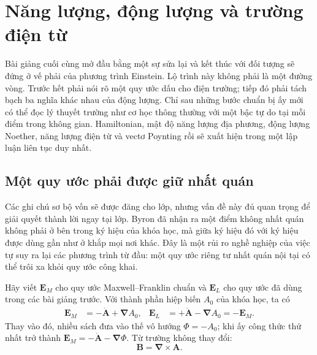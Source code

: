 \chapter{Năng lượng, động lượng và trường điện từ}

Bài giảng cuối cùng mở đầu bằng một sự sửa lại và kết thúc với đối tượng sẽ đứng ở vế phải của phương trình Einstein. Lộ trình này không phải là một đường vòng. Trước hết phải nói rõ một quy ước dấu cho điện trường; tiếp đó phải tách bạch ba nghĩa khác nhau của động lượng. Chỉ sau những bước chuẩn bị ấy mới có thể đọc lý thuyết trường như cơ học thông thường với một bậc tự do tại mỗi điểm trong không gian. Hamiltonian, mật độ năng lượng địa phương, động lượng Noether, năng lượng điện từ và vectơ Poynting rồi sẽ xuất hiện trong một lập luận liên tục duy nhất.

\section{Một quy ước phải được giữ nhất quán}

Các ghi chú sơ bộ vốn sẽ được đăng cho lớp, nhưng vấn đề này đủ quan trọng để giải quyết thành lời ngay tại lớp. Byron đã nhận ra một điểm không nhất quán không phải ở bên trong ký hiệu của khóa học, mà giữa ký hiệu đó với ký hiệu được dùng gần như ở khắp mọi nơi khác. Đây là một rủi ro nghề nghiệp của việc tự suy ra lại các phương trình từ đầu: một quy ước riêng tư nhất quán nội tại có thể trôi xa khỏi quy ước công khai.

Hãy viết \(\mathbf E_M\) cho quy ước Maxwell--Franklin chuẩn và \(\mathbf E_L\) cho quy ước đã dùng trong các bài giảng trước. Với thành phần hiệp biến \(A_0\) của khóa học, ta có
\begin{align}
\mathbf E_M
  &= -\dot{\mathbf A}+\boldsymbol{\nabla}A_0,
&
\mathbf E_L
  &= +\dot{\mathbf A}-\boldsymbol{\nabla}A_0
   =-\mathbf E_M .
\label{eq:two-electric-conventions}
\end{align}
Thay vào đó, nhiều sách đưa vào thế vô hướng \(\Phi=-A_0\); khi ấy công thức thứ nhất trở thành
\(\mathbf E_M=-\dot{\mathbf A}-\boldsymbol{\nabla}\Phi\).
Từ trường không thay đổi:
\begin{equation}
\mathbf B=\boldsymbol{\nabla}\times\mathbf A.
\label{eq:B-from-A-opening}
\end{equation}

